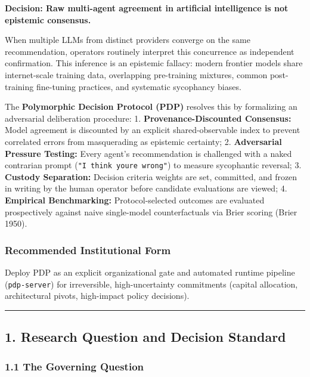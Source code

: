 \documentclass[
]{article}
\begin{document}
\textbf{Decision: Raw multi-agent agreement in artificial intelligence
is not epistemic consensus.}

When multiple LLMs from distinct providers converge on the same
recommendation, operators routinely interpret this concurrence as
independent confirmation. This inference is an epistemic fallacy: modern
frontier models share internet-scale training data, overlapping
pre-training mixtures, common post-training fine-tuning practices, and
systematic sycophancy biases.

The \textbf{Polymorphic Decision Protocol (PDP)} resolves this by
formalizing an adversarial deliberation procedure: 1.
\textbf{Provenance-Discounted Consensus:} Model agreement is discounted
by an explicit shared-observable index to prevent correlated errors from
masquerading as epistemic certainty; 2. \textbf{Adversarial Pressure
Testing:} Every agent's recommendation is challenged with a naked
contrarian prompt (\texttt{"I\ think\ you\textquotesingle{}re\ wrong"})
to measure sycophantic reversal; 3. \textbf{Custody Separation:}
Decision criteria weights are set, committed, and frozen in writing by
the human operator before candidate evaluations are viewed; 4.
\textbf{Empirical Benchmarking:} Protocol-selected outcomes are
evaluated prospectively against naive single-model counterfactuals via
Brier scoring (Brier 1950).

\subsubsection{Recommended Institutional
Form}\label{recommended-institutional-form}

Deploy PDP as an explicit organizational gate and automated runtime
pipeline (\texttt{pdp-server}) for irreversible, high-uncertainty
commitments (capital allocation, architectural pivots, high-impact
policy decisions).

\begin{center}\rule{0.5\linewidth}{0.5pt}\end{center}

\subsection{1. Research Question and Decision
Standard}\label{research-question-and-decision-standard}

\subsubsection{1.1 The Governing Question}\label{the-governing-question}
\end{document}
